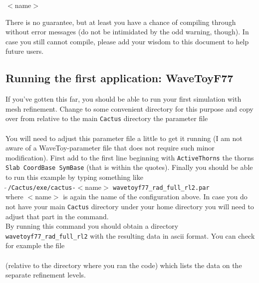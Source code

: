 \documentclass[11pt]{article}
\numberwithin{equation}{section}
\begin{document}
\hspace{1cm}{\tt make} $<$name$>$

There is no guarantee, but at least you have a chance of compiling through
without error messages (do not be intimidated by the odd warning, though).
In case you still cannot compile, please add your wisdom to this document to
help future users.


\subsection{Running the first application: WaveToyF77}

If you've gotten this far, you should be able to run your first
simulation with mesh refinement. Change to some convenient directory
for this purpose and copy over from relative to the main {\tt Cactus}
directory the parameter file\\

\hspace{1cm}{\tt arrangements/CarpetExtra/WaveToyF77/par/wavetoyf77\_rad\_full\_rl2.par}\\

You will need to adjust this parameter file a little to get it running (I am
not aware of a WaveToy-parameter file that does not require such minor
modification). First add to the first line beginning with {\tt ActiveThorns}
the thorns {\tt Slab CoordBase SymBase} (that is within the quotes).
Finally you should be able to run this example by typing something like\\

\hspace{1cm}{\tt mpirun -np 1} $\tilde{\,\,}${\tt /Cactus/exe/cactus-}$<$name$>$ {\tt wavetoyf77\_rad\_full\_rl2.par}\\

where $<$name$>$ is again the name of the configuration above. In case you do
not have your main {\tt Cactus} directory under your home directory you will
need to adjust that part in the command.\\
By running this command you should obtain a directory
{\tt wavetoyf77\_rad\_full\_rl2} with the resulting data in ascii format.
You can check for example the file\\

\hspace{1cm}{\tt wavetoyf77\_rad\_full\_rl2/phi.x.asc}\\

(relative to the directory where you ran the code)
which lists the data on the separate refinement levels.
\end{document}
